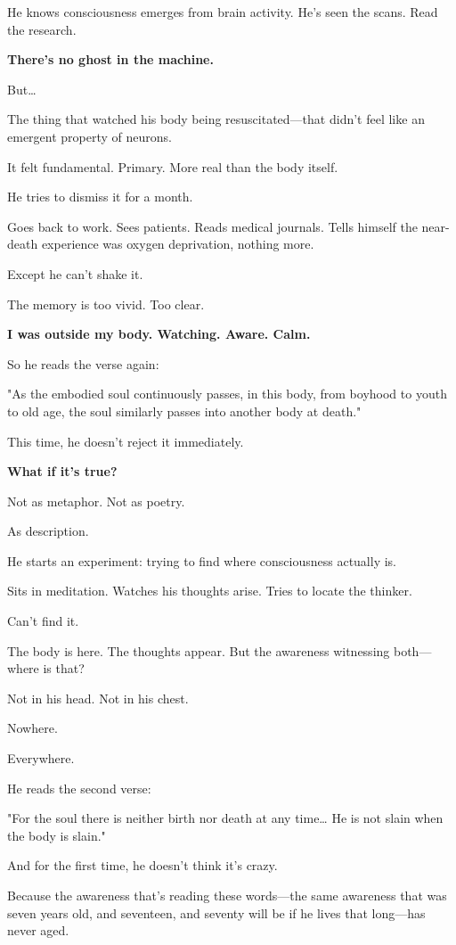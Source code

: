 \documentclass[11pt,twoside]{book}
\begin{document}
He knows consciousness emerges from brain activity. He's seen the scans. Read the research.

\textbf{There's no ghost in the machine.}

But\ldots{}

The thing that watched his body being resuscitated—that didn't feel like an emergent property of neurons.

It felt fundamental. Primary. More real than the body itself.

He tries to dismiss it for a month.

Goes back to work. Sees patients. Reads medical journals. Tells himself the near-death experience was oxygen deprivation, nothing more.

Except he can't shake it.

The memory is too vivid. Too clear.

\textbf{I was outside my body. Watching. Aware. Calm.}

So he reads the verse again:

"As the embodied soul continuously passes, in this body, from boyhood to youth to old age, the soul similarly passes into another body at death."

This time, he doesn't reject it immediately.

\textbf{What if it's true?}

Not as metaphor. Not as poetry.

As description.

He starts an experiment: trying to find where consciousness actually is.

Sits in meditation. Watches his thoughts arise. Tries to locate the thinker.

Can't find it.

The body is here. The thoughts appear. But the awareness witnessing both—where is that?

Not in his head. Not in his chest.

Nowhere.

Everywhere.

He reads the second verse:

"For the soul there is neither birth nor death at any time\ldots{} He is not slain when the body is slain."

And for the first time, he doesn't think it's crazy.

Because the awareness that's reading these words—the same awareness that was seven years old, and seventeen, and seventy will be if he lives that long—has never aged.
\end{document}
